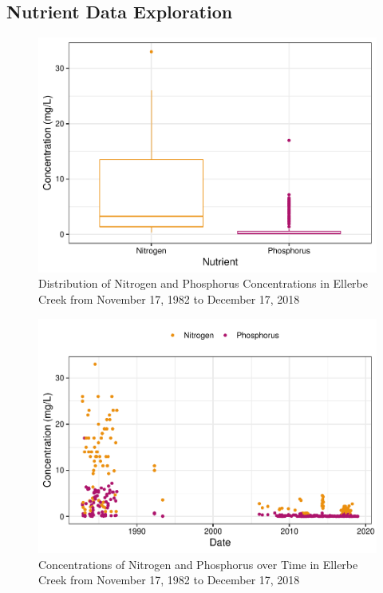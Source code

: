 \documentclass[12pt,]{article}
\begin{document}
\newpage

\hypertarget{nutrient-data-exploration}{%
\subsection{Nutrient Data Exploration}\label{nutrient-data-exploration}}

\newpage

\begin{figure}
\centering
\includegraphics{Landman_ENV872_Project_files/figure-latex/Exploratory Analysis Figure 4-1.pdf}
\caption{Distribution of Nitrogen and Phosphorus Concentrations in
Ellerbe Creek from November 17, 1982 to December 17, 2018}
\end{figure}

\begin{figure}
\centering
\includegraphics{Landman_ENV872_Project_files/figure-latex/Exploratory Analysis Figure 5-1.pdf}
\caption{Concentrations of Nitrogen and Phosphorus over Time in Ellerbe
Creek from November 17, 1982 to December 17, 2018}
\end{figure}
\end{document}
